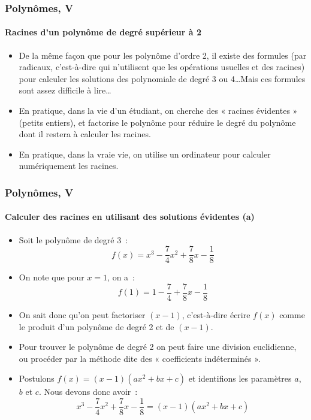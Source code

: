 \documentclass[10pt,notheorems]{beamer}
\theoremstyle{plain}
\theoremstyle{definition} %
\begin{document}
\begin{frame}
  \frametitle{Polynômes, V}
  \framesubtitle{Racines d'un polynôme de degré supérieur à 2}
  \hypertarget{slide_polynome_2_racines_5_1}{}

  \bigskip

  \begin{itemize}

  \item De la même façon que pour les polynôme d'ordre 2, il existe des formules (par radicaux, c'est-à-dire qui n'utilisent que les opérations usuelles et des racines) pour calculer les solutions des polynomiale de degré 3 ou 4\ldots Mais ces formules sont assez difficile à lire\ldots\newline

  \item En pratique, dans la vie d'un étudiant, on cherche des « racines évidentes » (petits entiers), et factorise le  polynôme pour réduire le degré du polynôme dont il restera à calculer les racines.\newline

  \item En pratique, dans la vraie vie, on utilise un ordinateur pour calculer numériquement les racines.\newline

  \end{itemize}

\end{frame}


\begin{frame}
  \frametitle{Polynômes, V}
  \framesubtitle{Calculer des racines en utilisant des solutions évidentes (a)}
  \hypertarget{slide_polynome_2_racines_5_2}{}

  \bigskip

  \begin{itemize}

  \item Soit le polynôme de degré 3~:
    \[
      f(x) = x^3-\frac{7}{4}x^2 + \frac{7}{8}x - \frac{1}{8}
    \]

  \item On note que pour $x=1$, on a~:
    \[
      f(1) = 1-\frac{7}{4}+\frac{7}{8}x -\frac{1}{8}
    \]

  \item On sait donc qu'on peut factoriser $(x-1)$, c'est-à-dire écrire $f(x)$ comme le produit d'un polynôme de degré 2 et de $(x-1)$.\newline

  \item Pour trouver le polynôme de degré 2 on peut faire une division euclidienne, ou procéder par la méthode dite des « coefficients indéterminés ».\newline

  \item Postulons $f(x) = (x-1)(ax^2+bx+c)$ et identifions les paramètres $a$, $b$ et $c$. Nous devons donc avoir~:
    \[
      x^3-\frac{7}{4}x^2+\frac{7}{8}x -\frac{1}{8} = (x-1)(ax^2+bx+c)
    \]

  \end{itemize}

\end{frame}
\end{document}
